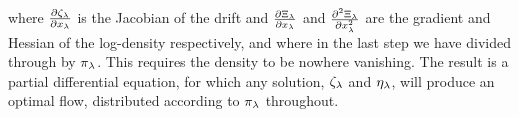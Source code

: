 \documentclass{article}
\begin{document}
%
where $\frac{\partial \zeta_{\lambda}}{\partial x_{\lambda}}$ is the Jacobian of the drift and $\frac{\partial \Xi_{\lambda}}{\partial x_{\lambda}}$ and $\frac{\partial^2 \Xi_{\lambda}}{\partial x_{\lambda}^2}$ are the gradient and Hessian of the log-density respectively, and where in the last step we have divided through by $\pi_{\lambda}$. This requires the density to be nowhere vanishing. The result is a partial differential equation, for which any solution, $\zeta_{\lambda}$ and $\eta_{\lambda}$, will produce an optimal flow, distributed according to $\pi_{\lambda}$ throughout.





%
\end{document}
